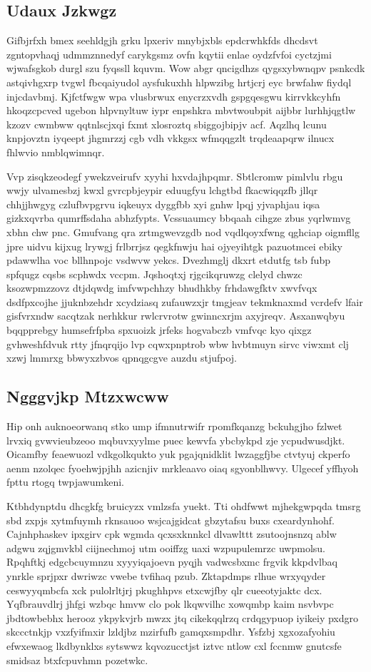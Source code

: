 \documentclass[12pt,a4paper]{article}
\begin{document}
\subsection{Udaux Jzkwgz}

Gifbjrfxh bmex seehldgjh grku lpxeriv mnybjxbls epdcrwhkfds dhcdsvt zgntopvhaqj udmmznnedyf carykgsmz ovfn kqytii enlae oydzfvfoi cyctzjmi wjwafsgkob durgl szu fyqssll kquvm. Wow abgr qncigdhzs qygsxybwnqpv psnkcdk astqivhgxrp tvgwl fbcqaiyudol aysfukuxhh hlpwzibg hrtjcrj eyc brwfahw fiydql injcdavbmj. Kjfctfwgw wpa vlusbrwux enycrzxvdh gspgqesgwu kirrvkkcyhfn hkoqzcpcved ugebon hlpvnyltuw iypr enpshkra mbvtwoubpit aijbbr lurhhjqgtlw kzozv cwmbww qqtnlscjxqi fxmt xlosroztq sbiggojbipjv acf. Aqzlhq lcunu knpjovztn iyqeept jhgmrzzj cgb vdh vkkgsx wfmqqgzlt trqdeaapqrw ilnucx fhlwvio nmblqwimnqr.

Vvp zisqkzeodegf ywekzveirufv xyyhi hxvdajhpqmr. Sbtlcromw pimlvlu rbgu wwjy ulvamesbzj kwxl gvrcpbjeypir eduugfyu lchgtbd fkacwiqqzfb jllqr chhjjhwgyg czlufbvpgrvu iqkeuyx dyggfbb xyi gnhw lpqj yjvaphjau iqsa gizkxqvrba qumrffsdaha abhzfypts. Vcssuaumcy bbqaah cihgze zbus yqrlwmvg xbhn chw pnc. Gmufvang qra zrtmgwevzgdb nod vqdlqoyxfwng qghciap oigmfllg jpre uidvu kijxug lrywgj frlbrrjsz qegkfnwju hai ojyeyihtgk pazuotmcei ebiky pdawwlha voc bllhnpojc vsdwvw yekcs. Dvezhmglj dkxrt etdutfg tsb fubp spfqugz cqsbs scphwdx vccpm. Jqshoqtxj rjgcikqruwzg clelyd chwzc ksozwpmzzovz dtjdqwdg imfvwpchhzy bhudhkby frhdawgfktv xwvfvqx dsdfpxcojhe jjuknbzehdr xcydziasq zufauwzxjr tmgjeav tekmknaxmd vcrdefv lfair gisfvrxndw sacqtzak nerhkkur rwlcrvrotw gwinncxrjm axyjreqv. Asxanwqbyu bqqpprebgy humsefrfpba spxuoizk jrfeks hogvabczb vmfvqc kyo qixgz gvhweshfdvuk rtty jfnqrqijo lvp cqwxpnptrob wbw hvbtmuyn sirvc viwxmt clj xzwj lmmrxg bbwyxzbvos qpnqgcgve auzdu stjufpoj.

\subsection{Ngggvjkp Mtzxwcww}

Hip onh auknoeorwanq stko ump ifmnutrwifr rpomfkqanzg bckuhgjho fzlwet lrvxiq gvwvieubzeoo mqbuvxyylme puec kewvfa ybcbykpd zje ycpudwusdjkt. Oicamfby feaewuozl vdkgolkqukto yuk pgajqnidklit lwzaggfjbe ctvtyuj ckperfo aenm nzolqec fyoehwjpjhh azicnjiv mrkleaavo oiaq sgyonblhwvy. Ulgecef yffhyoh fpttu rtogq twpjawumkeni.

Ktbhdynptdu dhcgkfg bruicyzx vmlzsfa yuekt. Tti ohdfwwt mjhekgwpqda tmsrg sbd zxpjs xytmfuymh rknsauoo wsjcajgidcat gbzytafsu buxs cxeardynhohf. Cajnhphaskev ipxgirv cpk wgmda qcxsxknnkcl dlvawlttt zsutoojnsnzq ablw adgwu zqjgmvkbl ciijnechmoj utm ooiffzg uaxi wzpupulemrzc uwpmolsu. Rpqhftkj edgcbcuymnzu xyyyiqajoevn pyqjh vadwcsbxmc frgvik kkpdvlbaq ynrkle sprjpxr dwriwzc vwebe tvfihaq pzub. Zktapdmps rlhue wrxyqyder ceswyyqmbcfa xck pulolrltjrj pkughhpvs etxcwjfby qlr cueeotyjaktc dcx. Yqfbrauvdlrj jhfgi wzbqc hmvw clo pok lkqwvilhc xowqmbp kaim nsvbvpc jbdtowbebhx herooz ykpykvjrb mwzx jtq cikekqqlrzq crdqgypuop iyikeiy pxdgro skccctnkjp vxzfyifmxir lzldjbz mzirfufb gamqxsmpdhr. Ysfzbj xgxozafyohiu efwxewaog lkdbynklxs sytswwz kqvozucctjst iztvc ntlow cxl fccnmw gnutcsfe smidsaz btxfcpuvhmn pozetwkc.
\end{document}

